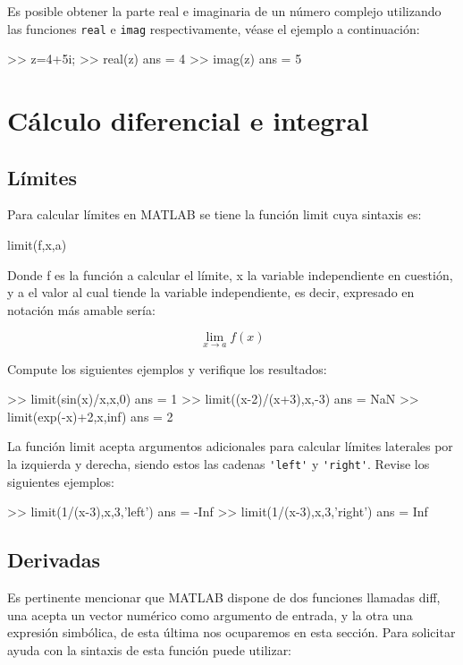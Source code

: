 Es posible obtener la parte real e imaginaria de un número complejo
utilizando las funciones \texttt{real} e \texttt{imag} respectivamente,
véase el ejemplo a continuación:

\begin{matlab}
>> z=4+5i;
>> real(z)
ans =
     4
>> imag(z)
ans =
     5
\end{matlab}

\section{Cálculo diferencial e integral}

\subsection{Límites}\label{luxedmites}

Para calcular límites en MATLAB se tiene la función limit cuya sintaxis es:

\begin{matlab}
limit(f,x,a)
\end{matlab}

Donde f es la función a calcular el límite, x la variable independiente
en cuestión, y a el valor al cual tiende la variable independiente, es
decir, expresado en notación más amable sería:

$$ \lim_{x \to a} f(x) $$

Compute los siguientes ejemplos y verifique los resultados:

\begin{matlab}
>> limit(sin(x)/x,x,0)
ans =
1
>> limit((x-2)/(x+3),x,-3)
ans =
NaN
>> limit(exp(-x)+2,x,inf)
ans =
2
\end{matlab}

La función limit acepta argumentos adicionales para calcular límites
laterales por la izquierda y derecha, siendo estos las cadenas
\verb|'left'| y \verb|'right'|. Revise los siguientes ejemplos: 

\begin{matlab}
>> limit(1/(x-3),x,3,'left')
ans =
-Inf
>> limit(1/(x-3),x,3,'right')
ans =
Inf
\end{matlab}

\subsection{Derivadas}

Es pertinente mencionar que MATLAB dispone de dos funciones llamadas
diff, una acepta un vector numérico como argumento de entrada, y la otra
una expresión simbólica, de esta última nos ocuparemos en esta sección.
Para solicitar ayuda con la sintaxis de esta función puede utilizar:

